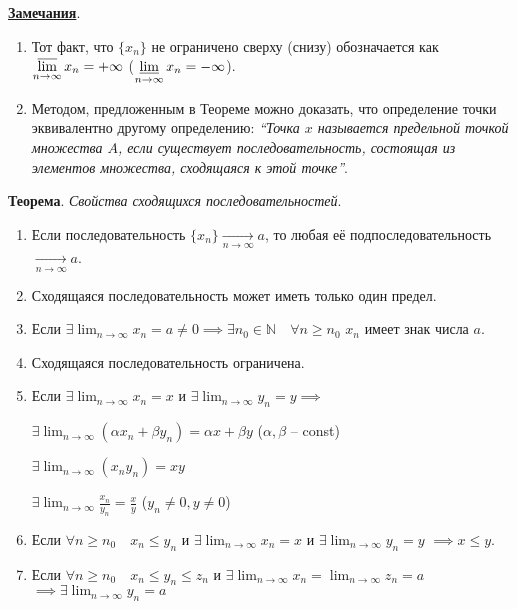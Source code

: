 \documentclass{article}
\newcommand{\parspace}{\vspace{10pt}}
\newcommand{\dslim}{\displaystyle\lim}
\newcommand{\dslimn}{\dslim_{n \to \infty}}
\begin{document}
\parspace

\underline{\textbf{Замечания}}.
\begin{enumerate}
    \item Тот факт, что $\{x_n\}$ не ограничено сверху (снизу) обозначается как 
    $\displaystyle\varlimsup_{n \to \infty} x_n = +\infty$ 
    ($\displaystyle\varliminf_{n \to \infty} x_n = -\infty$).

    \item Методом, предложенным в Теореме можно доказать, что определение точки
    эквивалентно другому определению: \textit{``Точка $x$ называется предельной точкой
    множества $A$, если существует последовательность, состоящая из элементов
    множества, сходящаяся к этой точке''}.
\end{enumerate}

\parspace

\textbf{Теорема}. \textit{Свойства сходящихся последовательностей}.

\begin{enumerate}
    \item Если последовательность $\{x_n\} \underset{n \to \infty}{\to} a$,
    то любая её подпоследовательность $\underset{n \to \infty}{\to} a$.

    \item Сходящаяся последовательность может иметь только один предел.
    \item Если $\exists \dslimn x_n = a \ne 0 \implies
    \exists n_0 \in \mathbb{N} \quad \forall n \ge n_0$ $x_n$ имеет знак числа $a$.

    \item Сходящаяся последовательность ограничена.
    \item Если $\exists \dslimn x_n = x$ и
    $\exists \dslimn y_n = y \implies$

    $\exists \dslimn (\alpha x_n + \beta y_n) = \alpha x + \beta y$
    ($\alpha, \beta$ -- const)

    $\exists \dslimn (x_n y_n) = x y$

    $\exists \dslimn \frac{x_n}{y_n} = \frac{x}{y}$
    ($y_n \ne 0, y \ne 0$)

    \item Если $\forall n \ge n_0 \quad x_n \le y_n$ и 
    $\exists \dslimn x_n = x$ и
    $\exists \dslimn y_n = y$ $\implies x \le y$.

    \item Если $\forall n \ge n_0 \quad x_n \le y_n \le z_n$ и
    $\exists \dslimn x_n = 
    \dslimn z_n = a$
    $\implies \exists \dslimn y_n = a$
\end{enumerate}
\end{document}
